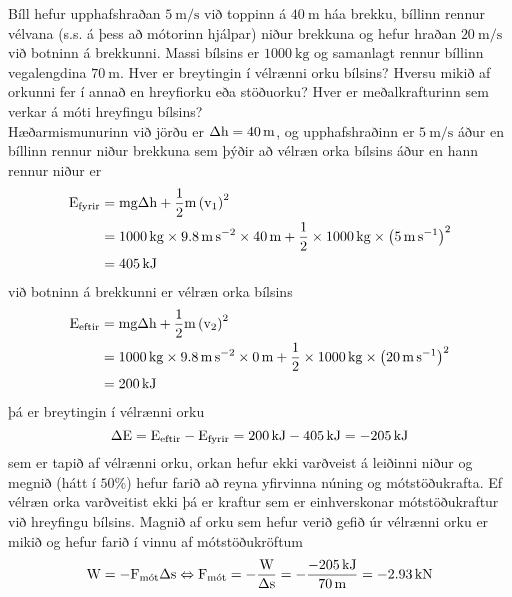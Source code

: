 \begin{formalexample}
Bíll hefur upphafshraðan $\SI{5}{\m\per\s}$ við toppinn á $\SI{40}{\m}$ háa brekku,
bíllinn rennur vélvana (s.s. á þess að mótorinn hjálpar) niður brekkuna og hefur
hraðan $\SI{20}{\m\per\s}$ við botninn á brekkunni. 
Massi bílsins er $\SI{1000}{\kg}$
og samanlagt rennur bíllinn vegalengdina $\SI{70}{\m}$.
Hver er breytingin í vélrænni orku bílsins? Hversu mikið af orkunni fer í annað
en hreyfiorku eða stöðuorku? Hver er meðalkrafturinn sem verkar á móti hreyfingu
bílsins?
\\[4 ex]
Hæðarmismunurinn við jörðu er $\Delta\ulengthh = \SI{40}{\m}$, og upphafshraðinn
er $\SI{5}{\m\per\s}$ áður en bíllinn rennur niður brekkuna sem þýðir að vélræn
orka bílsins áður en hann rennur niður er
\begin{align*}
	\umechenergy_\text{fyrir} 
		&= \umass \uacceleg \Delta\ulengthh + \frac{1}{2} \umass \left( \uspeed_1 \right)^2 \\
		&= \SI{1000}{\kg} \times \SI{9.8}{\m\per\s\squared} \times \SI{40}{\m} 
			+ \frac{1}{2} \times \SI{1000}{\kg} 
				\times \left( \SI{5}{\m\per\s} \right)^2 \\
		&= \SI{405}{\kJ}
\end{align*}
við botninn á brekkunni er vélræn orka bílsins
\begin{align*}
	\umechenergy_\text{eftir} 
		&= \umass \uacceleg \Delta\ulengthh + \frac{1}{2} \umass \left( \uspeed_2 \right)^2 \\
		&= \SI{1000}{\kg} \times \SI{9.8}{\m\per\s\squared} \times \SI{0}{\m} 
			+ \frac{1}{2} \times \SI{1000}{\kg}
				\times \left( \SI{20}{\m\per\s} \right)^2 \\
		&= \SI{200}{\kJ}
\end{align*}
þá er breytingin í vélrænni orku
\[
	\Delta\umechenergy = \umechenergy_\text{eftir} - \umechenergy_\text{fyrir} 
		= \SI{200}{\kJ} - \SI{405}{\kJ} = -\SI{205}{\kJ}
\]
sem er tapið af vélrænni orku, orkan hefur ekki varðveist á leiðinni niður og
megnið (hátt í $50 \%$) hefur farið að reyna yfirvinna núning og mótstöðukrafta.
Ef vélræn orka varðveitist ekki þá er kraftur sem er einhverskonar mótstöðukraftur
við hreyfingu bílsins. Magnið af orku sem hefur verið gefið úr vélrænni orku er
mikið og hefur farið í vinnu af mótstöðukröftum
\[
	\uworkw = - \uforce_\text{mót} \Delta\ulengths
		\Leftrightarrow
		\uforce_\text{mót} = - \frac{\uworkw}{\Delta\ulengths}
			= - \frac{ -\SI{205}{\kJ} }{ \SI{70}{\m} }
			= - \SI{2.93}{\kN}
\]
\end{formalexample}
